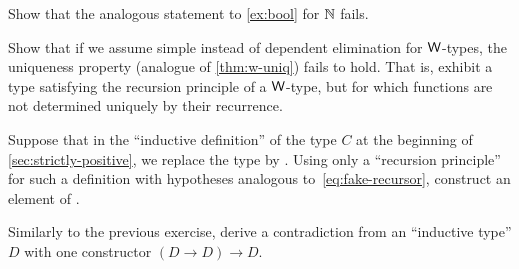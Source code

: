 \begin{ex}
  Show that the analogous statement to \autoref{ex:bool} for $\mathbb{N}$ fails.
\end{ex}

\begin{ex}
  Show that if we assume simple instead of dependent elimination for $\mathsf{W}$-types, the uniqueness property (analogue of \autoref{thm:w-uniq}) fails to hold.
  That is, exhibit a type satisfying the recursion principle of a $\mathsf{W}$-type, but for which functions are not determined uniquely by their recurrence.
\end{ex}

\begin{ex}\label{ex:loop}
  Suppose that in the ``inductive definition'' of the type $C$ at the beginning of \autoref{sec:strictly-positive}, we replace the type \nat by \emptyt.
  Using only a ``recursion principle'' for such a definition with hypotheses analogous to~\eqref{eq:fake-recursor}, construct an element of \emptyt.
\end{ex}

\begin{ex}\label{ex:loop2}
  Similarly to the previous exercise, derive a contradiction from an ``inductive type'' $D$ with one constructor $(D\to D) \to D$.
\end{ex}


